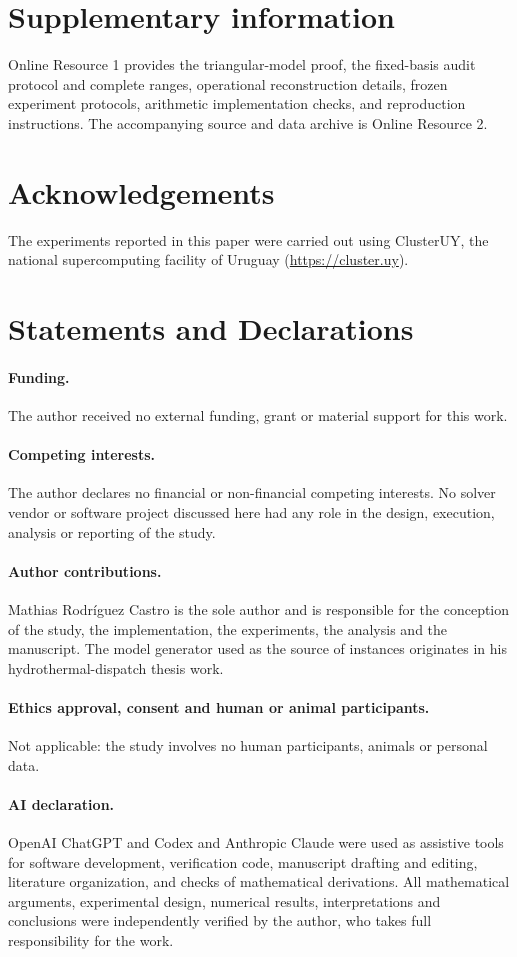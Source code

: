 \documentclass[smallextended,envcountsect,envcountsame]{svjour3}
\begin{document}
\section*{Supplementary information}
Online Resource 1 provides the triangular-model proof, the fixed-basis audit protocol and
complete ranges, operational reconstruction details, frozen experiment protocols, arithmetic
implementation checks, and reproduction instructions. The accompanying source and data archive
is Online Resource 2.




\section*{Acknowledgements}
The experiments reported in this paper were carried out using ClusterUY, the national
supercomputing facility of Uruguay (\url{https://cluster.uy}).

\section*{Statements and Declarations}
\paragraph{Funding.}
The author received no external funding, grant or material support for this work.
\paragraph{Competing interests.}
The author declares no financial or non-financial competing interests. No solver vendor
or software project discussed here had any role in the design, execution, analysis or
reporting of the study.
\paragraph{Author contributions.}
Mathias Rodr\'iguez Castro is the sole author and is responsible for the conception of
the study, the implementation, the experiments, the analysis and the manuscript. The
model generator used as the source of instances originates in his hydrothermal-dispatch
thesis work.
\paragraph{Ethics approval, consent and human or animal participants.}
Not applicable: the study involves no human participants, animals or personal data.
\paragraph{AI declaration.}
OpenAI ChatGPT and Codex and Anthropic Claude were used as assistive tools for software
development, verification code, manuscript drafting and editing, literature organization, and
checks of mathematical derivations. All mathematical arguments, experimental design, numerical
results, interpretations and conclusions were independently verified by the author, who takes
full responsibility for the work.
\end{document}
